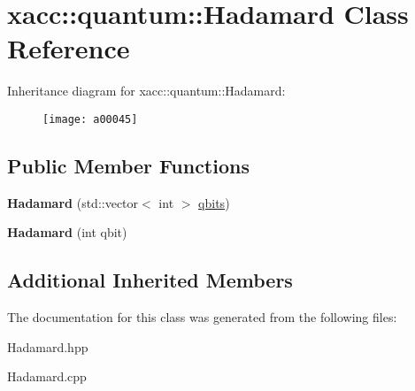 \hypertarget{a00045}{}\section{xacc\+:\+:quantum\+:\+:Hadamard Class Reference}
\label{a00045}
Inheritance diagram for xacc\+:\+:quantum\+:\+:Hadamard\+:\begin{figure}[H]
\begin{center}
\leavevmode
\texttt{[image: a00045]}
\end{center}
\end{figure}
\subsection*{Public Member Functions}
\begin{DoxyCompactItemize}
\item 
{\bfseries Hadamard} (std\+::vector$<$ int $>$ \hyperlink{a00042_a2a56be6c2519ea65df4d06f4abae1393}{qbits})\hypertarget{a00045_a1f26925eeb4a52ca7e52dd9158fe7005}{}\label{a00045_a1f26925eeb4a52ca7e52dd9158fe7005}

\item 
{\bfseries Hadamard} (int qbit)\hypertarget{a00045_aac4e06aae35583bcce39b6b178948364}{}\label{a00045_aac4e06aae35583bcce39b6b178948364}

\end{DoxyCompactItemize}
\subsection*{Additional Inherited Members}


The documentation for this class was generated from the following files\+:\begin{DoxyCompactItemize}
\item 
Hadamard.\+hpp\item 
Hadamard.\+cpp\end{DoxyCompactItemize}
